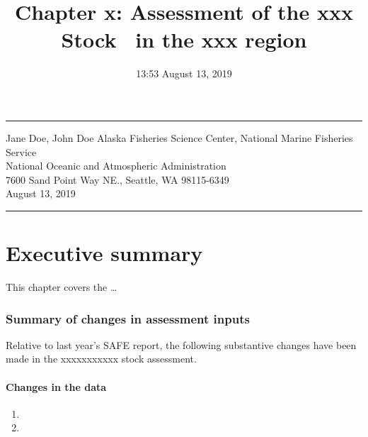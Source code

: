\documentclass[11pt,]{article}
\title{Chapter x: Assessment of the xxx Stock ~in the xxx region}
\author{}
\date{13:53 August 13, 2019}
\let\oldparagraph\paragraph
\renewcommand{\paragraph}[1]{\oldparagraph{#1}\mbox{}}
\begin{document}
\maketitle

{
\setcounter{tocdepth}{2}
\tableofcontents
}

\begin{center}\rule{0.5\linewidth}{\linethickness}\end{center}

\begin{centering}
  Jane Doe, John Doe 
\fontsize{10}{12}
\selectfont
  Alaska Fisheries Science Center, National Marine Fisheries Service \\
  National Oceanic and Atmospheric Administration \\ 
  7600 Sand Point Way NE., Seattle, WA 98115-6349 \\
August 13, 2019 \\
\end{centering}

\begin{center}\rule{0.5\linewidth}{\linethickness}\end{center}

\hypertarget{executive-summary}{%
\section{Executive summary}\label{executive-summary}}

This chapter covers the \ldots{}

\hypertarget{summary-of-changes-in-assessment-inputs}{%
\subsubsection{Summary of changes in assessment
inputs}\label{summary-of-changes-in-assessment-inputs}}

Relative to last year's SAFE report, the following substantive changes
have been made in the xxxxxxxxxxx stock assessment.

\hypertarget{changes-in-the-data}{%
\paragraph{Changes in the data}\label{changes-in-the-data}}

\begin{enumerate}
\def\labelenumi{\arabic{enumi}.}
\item
\item
\end{enumerate}
\end{document}
